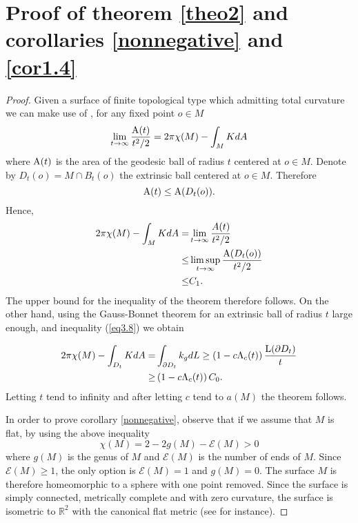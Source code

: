 \documentclass[a4paper]{amsart}
\theoremstyle{definition}
\numberwithin{equation}{section}
\begin{document}
\section{Proof of theorem \ref{theo2} and corollaries \ref{nonnegative} and \ref{cor1.4}}
\begin{proof}Given a surface of finite topological type which admitting total curvature we can make use of  \cite[theorem A]{Shiohama}, for any fixed point $o\in M$
\begin{equation}
\lim_{t\to\infty}\frac{{\rm A}(t)}{t^2/2}=2\pi\chi(M)-\int_MKdA
\end{equation}
where ${\rm A}(t)$ is the area of the geodesic ball of radius $t$ centered at $o\in M$. 
Denote by $D_t(o)=M\cap B_t(o)$ the extrinsic ball centered at $o\in M$. Therefore
\begin{equation}
{\rm A}(t)\leq {\rm A}(D_t(o)).
\end{equation} Hence,
\begin{equation}
\begin{aligned}
2\pi\chi(M)-\int_MKdA=&\lim_{t\to\infty}\frac{A(t)}{t^2/2}\\
\leq & \limsup_{t\to\infty}\frac{{\rm A}(D_t(o))}{t^2/2}\\
\leq &  C_1.
\end{aligned}
\end{equation}
 The upper bound for the inequality of the theorem therefore follows. On the other hand, using the Gauss-Bonnet theorem for an extrinsic ball of radius $t$ large enough, and inequality (\ref{eq3.8}) we obtain

\begin{equation}\begin{aligned}
2\pi\chi(M)-\int_{D_t}KdA=&\int_{\partial D_t}k_gdL\geq \left(1-c\Lambda_c(t)\right)\frac{{\rm L}(\partial D_t)}{t} \\
\geq &\left(1-c\Lambda_c(t)\right)C_0.\end{aligned}
\end{equation}
Letting $t$ tend to infinity and after letting $c$ tend to $a(M)$ the theorem follows.

In order to prove corollary \ref{nonnegative}, observe that if we assume that $M$ is flat, by using the above inequality
\begin{equation}
\chi(M)=2-2g(M)-{\mathcal{E}}(M)>0
\end{equation}
where $g(M)$ is the genus of $M$ and ${\mathcal{E}}(M)$ is the number of ends of $M$. Since ${\mathcal{E}}(M)\geq 1$, the only option is ${\mathcal{E}}(M)=1$ and $g(M)=0$. The surface $M$ is therefore homeomorphic to a sphere with one point removed. Since the surface is simply connected, metrically complete and with  zero curvature, the surface is isometric to ${\mathbb{R}}^2$ with the canonical flat metric (see \cite[theorem 11.12]{John} for instance).  


\end{proof}
\end{document}
